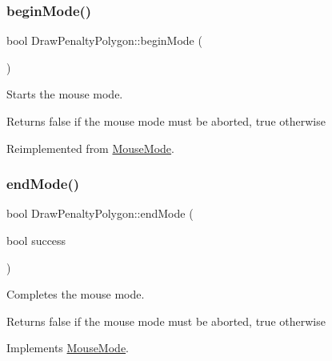 \subsubsection{\texorpdfstring{beginMode()}{beginMode()}}
{\footnotesize\ttfamily bool Draw\+Penalty\+Polygon\+::begin\+Mode (\begin{DoxyParamCaption}{ }\end{DoxyParamCaption})\hspace{0.3cm}{\ttfamily [virtual]}}



Starts the mouse mode. 

\begin{DoxyReturn}{Returns}
false if the mouse mode must be aborted, true otherwise 
\end{DoxyReturn}


Reimplemented from \mbox{\hyperlink{class_mouse_mode_a32f232953a46467d2fe636df8907bd74}{Mouse\+Mode}}.

\mbox{\label{class_draw_penalty_polygon_acf00ec45918544a8a33adc4582270c06}} 
\subsubsection{\texorpdfstring{endMode()}{endMode()}}
{\footnotesize\ttfamily bool Draw\+Penalty\+Polygon\+::end\+Mode (\begin{DoxyParamCaption}\item[{bool}]{success }\end{DoxyParamCaption})\hspace{0.3cm}{\ttfamily [virtual]}}



Completes the mouse mode. 

\begin{DoxyReturn}{Returns}
false if the mouse mode must be aborted, true otherwise 
\end{DoxyReturn}


Implements \mbox{\hyperlink{class_mouse_mode_ad88ebf649b48364a343c86c14513039e}{Mouse\+Mode}}.

\mbox{\label{class_draw_penalty_polygon_a55173a612268b53b34585ef0b2505ac0}} 
